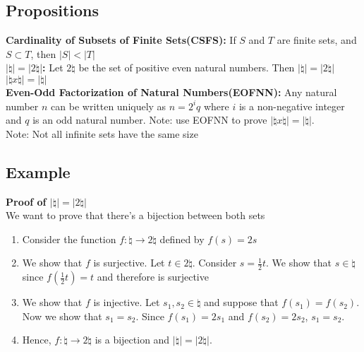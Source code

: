 \documentclass[12pt]{report}
\begin{document}
		\subsection{Propositions}
			\textbf{Cardinality of Subsets of Finite Sets(CSFS):} If $S$ and $T$ are finite sets, and $S \subset T$, then $|S| < |T|$ \\
			\textbf{$|\natural| = |2\natural|$:} Let $2\natural$ be the set of positive even natural numbers. Then $|\natural| = |2\natural|$\\
			\textbf{$|\natural x \natural| = |\natural|$}\\
			\textbf{Even-Odd Factorization of Natural Numbers(EOFNN):} Any natural number $n$ can be written uniquely as $n = 2^iq$ where $i$ is a non-negative integer and $q$ is an odd natural number.
			Note: use EOFNN to prove $|\natural x \natural| = |\natural|$.\\
			Note: Not all infinite sets have the same size
		\subsection{Example}
			\textbf{Proof of $|\natural| = |2\natural|$}\\
			We want to prove that there's a bijection between both sets
			\begin{enumerate}
				\item Consider the function $f:\natural \rightarrow 2\natural$ defined by $f(s) = 2s$
				\item We show that $f$ is surjective. Let $t \in 2\natural$. Consider $s = \frac{1}{2}t$. We show that $s \in \natural$ since $f(\frac{1}{2}t) = t$ and therefore is surjective
				\item We show that $f$ is injective. Let $s_1, s_2 \in \natural$ and suppose that $f(s_1) = f(s_2)$. Now we show that $s_1 = s_2$. Since $f(s_1) = 2s_1$ and $f(s_2) = 2s_2$, $s_1 = s_2$. 
				\item Hence, $f:\natural \rightarrow 2\natural$ is a bijection and $|\natural| = |2\natural|$.
			\end{enumerate}
\end{document}
